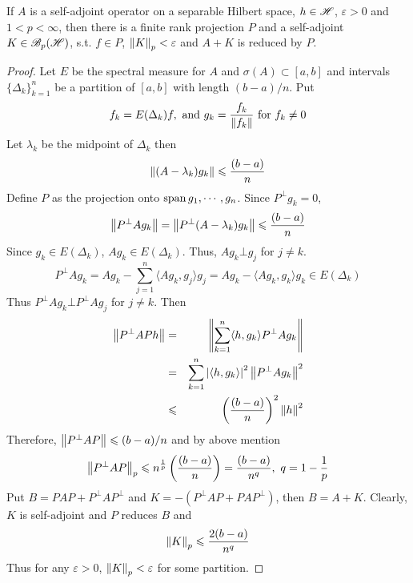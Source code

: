 \begin{lem}
	If $A$ is a self-adjoint operator on a separable Hilbert space, $h \in \mathscr{H}$, $\varepsilon > 0$ and $1 < p < \infty$, then there is a finite rank projection $P$ and a self-adjoint $K \in \mathscr{B}_p(\mathscr{H})$, s.t. $f \in P$, $\left\lVert K\right\lVert_p < \varepsilon$ and $A+K$ is reduced by $P$.
\end{lem}
\begin{proof}
	Let $E$ be the spectral measure for $A$ and $\sigma(A) \subset [a,b]$ and intervals $\{\Delta_k\}_{k=1}^{n}$ be a partition of $[a,b]$ with length $(b-a)/n$. Put
	\begin{equation*}
		f_k = E(\Delta_k) f, \text{ and } g_k = \frac{f_k}{\left\lVert f_k\right\lVert} \text{ for } f_k \neq 0
	\end{equation*}
	Let $\lambda_k$ be the midpoint of $\Delta_k$ then
	\begin{equation*}
		\left\lVert(A-\lambda_k)g_k\right\lVert \leqslant \frac{(b-a)}{n}
	\end{equation*}
	Define $P$ as the projection onto $\operatorname{span}{g_1,\cdots,g_n}$. Since $P^{\bot}g_k = 0$,
	\begin{equation*}
		\left\lVert P^{\bot} Ag_k\right\lVert = \left\lVert P^{\bot}(A-\lambda_k)g_k\right\lVert \leqslant \frac{(b-a)}{n}
	\end{equation*}
	Since $g_k \in E(\Delta_k)$, $Ag_k \in E(\Delta_k)$. Thus, $Ag_k \bot g_j$ for $j \neq k$.
	\begin{equation*}
		P^{\bot} Ag_k = Ag_k - \sum_{j=1}^{n} \langle Ag_k,g_j \rangle g_j = Ag_k - \langle Ag_k,g_k \rangle g_k \in E(\Delta_k)
	\end{equation*}
	Thus $P^{\bot}Ag_k \bot P^{\bot}Ag_j$ for $j \neq k$. Then
	\begin{eqnarray*}
		\left\lVert P^{\bot}APh\right\lVert &=& \left\lVert\sum_{k=1}^n \langle h,g_k \rangle P^{\bot}Ag_k\right\lVert \\
		&=& \sum_{k=1}^n \left\lvert\langle h,g_k \rangle\right\lvert^2 \left\lVert P^{\bot}Ag_k\right\lVert^2 \\
		&\leqslant& \left(\frac{(b-a)}{n} \right)^2 \left\lVert h\right\lVert^2
	\end{eqnarray*}
	Therefore, $\left\lVert P^{\bot}AP\right\lVert \leqslant {(b-a)}/{n}$ and by above mention
	\begin{equation*}
		\left\lVert P^{\bot}AP\right\lVert_p \leqslant n^{\frac{1}{p}} \left(\frac{(b-a)}{n} \right) = \frac{(b-a)}{n^q},~ q = 1 - \frac{1}{p}
	\end{equation*}
	Put $B = PAP + P^{\bot}AP^{\bot}$ and $K = -(P^{\bot}AP + PAP^{\bot})$, then $B = A + K$. Clearly, $K$ is self-adjoint and $P$ reduces $B$ and 
	\begin{equation*}
		\left\lVert K\right\lVert_p \leqslant \frac{2(b-a)}{n^q}
 	\end{equation*}
 	Thus for any $\varepsilon > 0$, $\left\lVert K\right\lVert_p < \varepsilon$ for some partition.
\end{proof}

